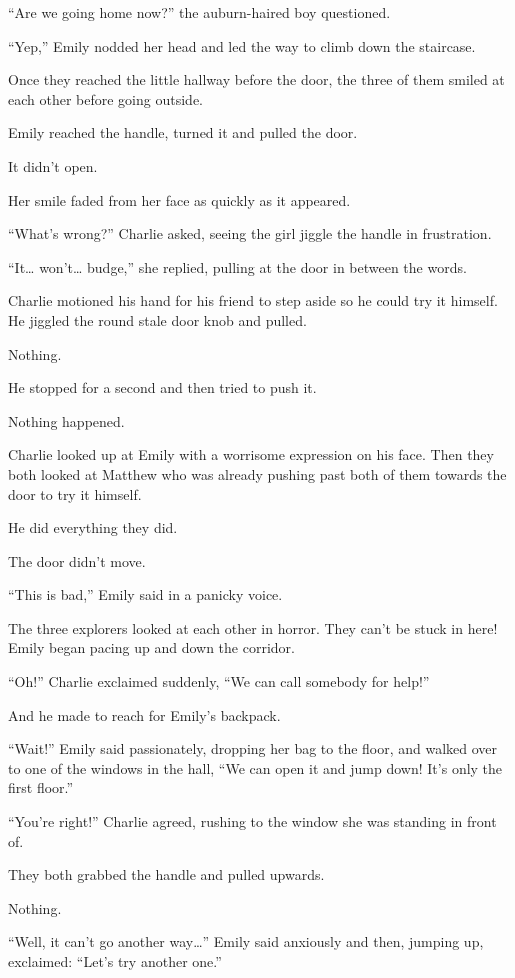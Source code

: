 “Are we going home now?” the auburn-haired boy questioned.

“Yep,” Emily nodded her head and led the way to climb down the staircase.

Once they reached the little hallway before the door, the three of them smiled at each other before going outside.

Emily reached the handle, turned it and pulled the door.

It didn't open.

Her smile faded from her face as quickly as it appeared.

“What's wrong?” Charlie asked, seeing the girl jiggle the handle in frustration.

“It… won't… budge,” she replied, pulling at the door in between the words.

Charlie motioned his hand for his friend to step aside so he could try it himself. He jiggled the round stale door knob and pulled.

Nothing.

He stopped for a second and then tried to push it.

Nothing happened.

Charlie looked up at Emily with a worrisome expression on his face. Then they both looked at Matthew who was already pushing past both of them towards the door to try it himself.

He did everything they did.

The door didn't move.

“This is bad,” Emily said in a panicky voice.

The three explorers looked at each other in horror. They can't be stuck in here! Emily began pacing up and down the corridor.

“Oh!” Charlie exclaimed suddenly, “We can call somebody for help!”

And he made to reach for Emily's backpack.

“Wait!” Emily said passionately, dropping her bag to the floor, and walked over to one of the windows in the hall, “We can open it and jump down! It's only the first floor.”

“You're right!” Charlie agreed, rushing to the window she was standing in front of.

They both grabbed the handle and pulled upwards.

Nothing.

“Well, it can't go another way…” Emily said anxiously and then, jumping up, exclaimed: “Let's try another one.”

